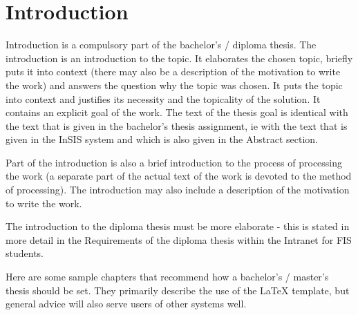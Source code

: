\chapter*{Introduction}

Introduction is a compulsory part of the bachelor's / diploma thesis. The introduction is an introduction to the topic. It elaborates the chosen topic, briefly puts it into context (there may also be a description of the motivation to write the work) and answers the question why the topic was chosen. It puts the topic into context and justifies its necessity and the topicality of the solution. It contains an explicit goal of the work. The text of the thesis goal is identical with the text that is given in the bachelor's thesis assignment, ie with the text that is given in the InSIS system and which is also given in the Abstract section.

Part of the introduction is also a brief introduction to the process of processing the work (a separate part of the actual text of the work is devoted to the method of processing). The introduction may also include a description of the motivation to write the work.

The introduction to the diploma thesis must be more elaborate - this is stated in more detail in the Requirements of the diploma thesis within the Intranet for FIS students.

Here are some sample chapters that recommend how a bachelor's / master's thesis should be set. They primarily describe the use of the \LaTeX{} template, but general advice will also serve users of other systems well.